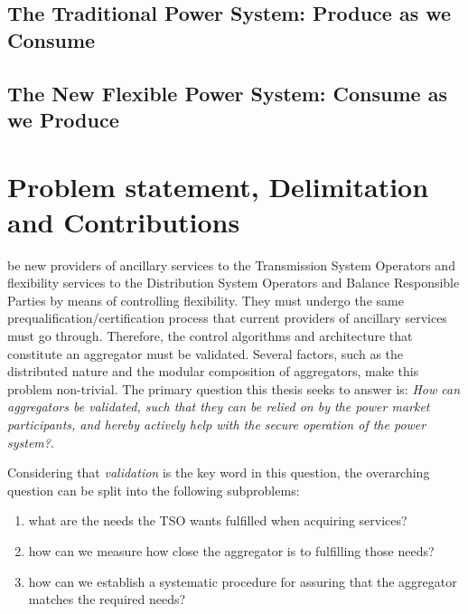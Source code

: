 \subsection*{The Traditional Power System: Produce as we Consume}
\label{sub:traditional}

\subsection*{The New Flexible Power System: Consume as we Produce}
\label{sub:future}


\section{Problem statement, Delimitation and Contributions} %
\label{sec:funneling}
 be new providers of ancillary services to the Transmission System Operators and flexibility services to the Distribution System Operators and Balance Responsible Parties by means of controlling flexibility. They must undergo the same prequalification/certification process that current providers of ancillary services must go through. Therefore, the control algorithms and architecture that constitute an aggregator must be validated. Several factors, such as the distributed nature and the modular composition of aggregators, make this problem non-trivial. The primary question this thesis seeks to answer is: \emph{How can aggregators be validated, such that they can be relied on by the power market participants, and hereby actively help with the secure operation of the power system?}.

Considering that \emph{validation} is the key word in this question, the overarching question can be split into the following subproblems:
\begin{enumerate}
	\item what are the needs the TSO wants fulfilled when acquiring services?
	\item how can we measure how close the aggregator is to fulfilling those needs?
	\item how can we establish a systematic procedure for assuring that the aggregator matches the required needs?
\end{enumerate}

